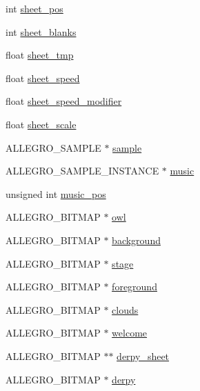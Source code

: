\begin{DoxyCompactItemize}
\item 
int \hyperlink{structLevel_a21c699af201ffe60ccd1319b3f540947}{sheet\-\_\-pos}
\item 
int \hyperlink{structLevel_aebaaba311e5d4842fdbd8c50edd40808}{sheet\-\_\-blanks}
\item 
float \hyperlink{structLevel_a22e80ea91fd267dae85c0457e581d072}{sheet\-\_\-tmp}
\item 
float \hyperlink{structLevel_a41db1345ac158898450907010a49748f}{sheet\-\_\-speed}
\item 
float \hyperlink{structLevel_a3cae10fd441bcc14b6a47dd5fedafa59}{sheet\-\_\-speed\-\_\-modifier}
\item 
float \hyperlink{structLevel_a267a140bd3de1fc3f23a88623de425ed}{sheet\-\_\-scale}
\item 
\-A\-L\-L\-E\-G\-R\-O\-\_\-\-S\-A\-M\-P\-L\-E $\ast$ \hyperlink{structLevel_a234fa7b9ec35dd360e4e3c48a944fc7d}{sample}
\item 
\-A\-L\-L\-E\-G\-R\-O\-\_\-\-S\-A\-M\-P\-L\-E\-\_\-\-I\-N\-S\-T\-A\-N\-C\-E $\ast$ \hyperlink{structLevel_a41c6aae8f508e078b02c291e1d6f8e67}{music}
\item 
unsigned int \hyperlink{structLevel_a13e322deb3298846260af31324e5b492}{music\-\_\-pos}
\item 
\-A\-L\-L\-E\-G\-R\-O\-\_\-\-B\-I\-T\-M\-A\-P $\ast$ \hyperlink{structLevel_af504e3f628040bc2a2913a50253e856d}{owl}
\item 
\-A\-L\-L\-E\-G\-R\-O\-\_\-\-B\-I\-T\-M\-A\-P $\ast$ \hyperlink{structLevel_a4b4dd31284206502977b3d5b95d52abc}{background}
\item 
\-A\-L\-L\-E\-G\-R\-O\-\_\-\-B\-I\-T\-M\-A\-P $\ast$ \hyperlink{structLevel_ad412b858a4e688114dd89a44ecb005bb}{stage}
\item 
\-A\-L\-L\-E\-G\-R\-O\-\_\-\-B\-I\-T\-M\-A\-P $\ast$ \hyperlink{structLevel_a26c758ccdc7404a3ee0e766d1cbbf0be}{foreground}
\item 
\-A\-L\-L\-E\-G\-R\-O\-\_\-\-B\-I\-T\-M\-A\-P $\ast$ \hyperlink{structLevel_a27d34b57b66d4e7f733cb6a5cc16ff18}{clouds}
\item 
\-A\-L\-L\-E\-G\-R\-O\-\_\-\-B\-I\-T\-M\-A\-P $\ast$ \hyperlink{structLevel_a575fec7686bd94b5c35b15d73296c977}{welcome}
\item 
\-A\-L\-L\-E\-G\-R\-O\-\_\-\-B\-I\-T\-M\-A\-P $\ast$$\ast$ \hyperlink{structLevel_a0e02f3a5674a2ad3c23de22b6a4ed044}{derpy\-\_\-sheet}
\item 
\-A\-L\-L\-E\-G\-R\-O\-\_\-\-B\-I\-T\-M\-A\-P $\ast$ \hyperlink{structLevel_ae33832497116b7a0c184959bbde21ee5}{derpy}
$$
\end{DoxyCompactItemize}
